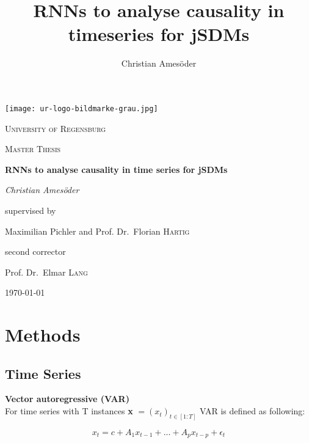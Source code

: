 \documentclass[a4paper]{report}
\begin{document}
 
	
	\author{Christian Ames\"oder}

\title {RNNs to analyse causality in timeseries for jSDMs}

\begin{titlepage}
	\centering
	\texttt{[image: ur-logo-bildmarke-grau.jpg]}\par\vspace{1cm}
	{\scshape \LARGE University of Regensburg\par}
	\vspace{1cm}
	{\scshape\Large Master Thesis\par}
	\vspace{1.5cm}
	{\huge\bfseries RNNs to analyse causality in time series for jSDMs\par}
	\vspace{2cm}
	{\Large\itshape Christian Ames\"oder\par}
	\vfill
	supervised by\par
	Maximilian Pichler and Prof. Dr.~Florian \textsc{Hartig}
	
	\vfill
	
	second corrector \par
	Prof. Dr.~Elmar \textsc{Lang}
	\vfill
	
	{\large \today\par}
\end{titlepage}

	\tableofcontents

	\chapter{Methods}
	
	\section{Time Series}
	\textbf{Vector autoregressive (VAR)}\\
	For time series with T instances \textbf{x} $ = (x_t)_{t\in [1:T]}$ VAR is defined as following:
	
	
	\begin{equation} \label {lasso}
		x_t = c+ A_1x_{t-1}+...+ A_p x_{t-p}+\epsilon_t
	\end{equation}
\end{document}
